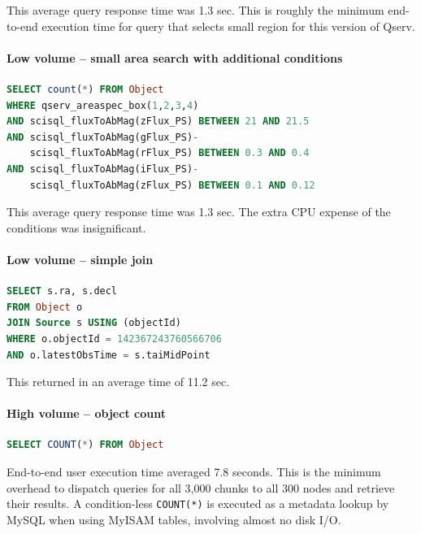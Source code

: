 \documentclass[DM,lsstdraft,toc]{lsstdoc}
\begin{document}
This average query response time was 1.3 sec. This is roughly the
minimum end-to-end execution time for query that selects small region
for this version of Qserv.

\paragraph{Low volume -- small area search with additional
conditions}\label{low-volume-small-area-search-with-additional-conditions}

\begin{lstlisting}[language=SQL]
SELECT count(*) FROM Object
WHERE qserv_areaspec_box(1,2,3,4)
AND scisql_fluxToAbMag(zFlux_PS) BETWEEN 21 AND 21.5
AND scisql_fluxToAbMag(gFlux_PS)-
    scisql_fluxToAbMag(rFlux_PS) BETWEEN 0.3 AND 0.4
AND scisql_fluxToAbMag(iFlux_PS)-
    scisql_fluxToAbMag(zFlux_PS) BETWEEN 0.1 AND 0.12
\end{lstlisting}

This average query response time was 1.3 sec. The extra CPU expense of
the conditions was insignificant.

\paragraph{Low volume -- simple join}\label{low-volume-simple-join}

\begin{lstlisting}[language=SQL]
SELECT s.ra, s.decl
FROM Object o
JOIN Source s USING (objectId)
WHERE o.objectId = 142367243760566706
AND o.latestObsTime = s.taiMidPoint
\end{lstlisting}

This returned in an average time of 11.2 sec.

\paragraph{High volume -- object count}\label{high-volume-object-count}

\begin{lstlisting}[language=SQL]
SELECT COUNT(*) FROM Object
\end{lstlisting}

End-to-end user execution time averaged 7.8 seconds. This is the minimum
overhead to dispatch queries for all 3,000 chunks to all 300 nodes and
retrieve their results. A condition-less \texttt{COUNT(*)} is executed
as a metadata lookup by MySQL when using MyISAM tables, involving almost
no disk I/O.
\end{document}
